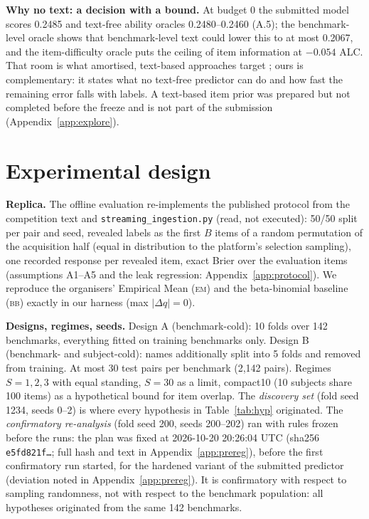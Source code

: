 \documentclass{article}
\newcommand{\BB}{\textsc{bb}}
\newcommand{\EM}{\textsc{em}}
\newcommand{\prereghashshort}{e5fd821f}
\newcommand{\preregtime}{2026-10-20 20:26:04 UTC}
\begin{document}
\textbf{Why no text: a decision with a bound.} At budget 0 the submitted model scores 0.2485 and text-free ability oracles 0.2480--0.2460 (A.5); the benchmark-level oracle shows that benchmark-level text could lower this to at most 0.2067, and the item-difficulty oracle
puts the ceiling of item information at $-0.054$ ALC. That room is what amortised, text-based approaches target
\citep{truong2025amortized, zhou2025adele, pacchiardi2024hundred}; ours is complementary: it states what no text-free
predictor can do and how fast the remaining error falls with labels. A text-based item prior was prepared but not completed before the freeze and is not part of the submission
(Appendix~\ref{app:explore}).

\section{Experimental design}
\label{sec:design}

\textbf{Replica.} The offline evaluation re-implements the published protocol from the competition text and
\texttt{streaming\_ingestion.py} (read, not executed): 50/50 split per pair and seed, revealed labels as the first $B$
items of a random permutation of the acquisition half (equal in distribution to the platform's selection sampling), one
recorded response per revealed item, exact Brier over the evaluation items (assumptions A1--A5 and the leak regression:
Appendix~\ref{app:protocol}). We reproduce the organisers' Empirical Mean (\EM) and the beta-binomial baseline (\BB)
exactly in our harness (max $|\Delta q| = 0$).

\textbf{Designs, regimes, seeds.} Design A (benchmark-cold): 10 folds over 142 benchmarks, everything fitted on training
benchmarks only. Design B (benchmark- and subject-cold): names additionally split into 5 folds and removed from
training. At most 30 test pairs per benchmark (2,142 pairs). Regimes $S = 1, 2, 3$ with equal standing, $S = 30$ as a
limit, compact10 (10 subjects share 100 items) as a hypothetical bound for item overlap. The \emph{discovery set}
(fold seed 1234, seeds 0--2) is where every hypothesis in Table~\ref{tab:hyp} originated. The \emph{confirmatory
re-analysis} (fold seed 200, seeds 200--202) ran with rules frozen before the runs: the plan was fixed at
\preregtime{} (sha256 \texttt{\prereghashshort\ldots}; full hash and text in Appendix~\ref{app:prereg}), before the
first confirmatory run started, for the hardened variant of the submitted predictor (deviation noted in
Appendix~\ref{app:prereg}). It is confirmatory with respect to sampling randomness, not with respect to the
benchmark population: all hypotheses originated from the same 142 benchmarks.
\end{document}
